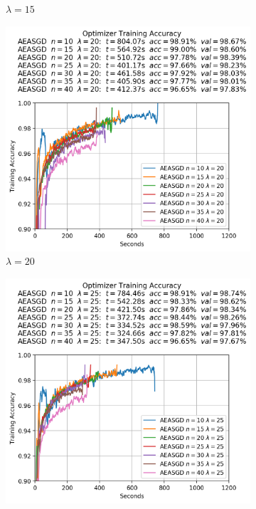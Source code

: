 \begin{figure}
\begin{subfigure}{.3\textwidth}
    \caption{$\lambda = 15$}
  \end{subfigure}
  \begin{subfigure}{.3\textwidth}
    \centering
    \includegraphics[width=\linewidth]{resources/images/aeasgd_experiments_lambda_20}
    \caption{$\lambda = 20$}
  \end{subfigure}
  \begin{subfigure}{.3\textwidth}
    \centering
    \includegraphics[width=\linewidth]{resources/images/aeasgd_experiments_lambda_25}

\end{subfigure}
\end{figure}
